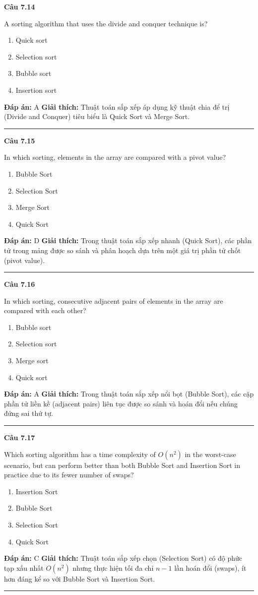\documentclass[11pt,a4paper]{article}
\newenvironment{question}[1]{%
  \par\vspace{1em}\noindent\textbf{\large Câu #1}\par\vspace{0.4em}
}{%
  \par\vspace{1em}\hrule\vspace{0.6em}
}
\newenvironment{choices}{%
  \begin{enumerate}[label=\textbf{\Alph*.},leftmargin=2.2em,itemsep=2pt,topsep=3pt]
}{%
  \end{enumerate}
}
\newcommand{\choice}{\item}
\begin{document}
\begin{question}{7.14}
A sorting algorithm that uses the divide and conquer technique is?
\begin{choices}
\choice Quick sort
\choice Selection sort
\choice Bubble sort
\choice Insertion sort
\end{choices}
\textbf{Đáp án:} A
\textbf{Giải thích:} Thuật toán sắp xếp áp dụng kỹ thuật chia để trị (Divide and Conquer) tiêu biểu là Quick Sort và Merge Sort.
\end{question}

\begin{question}{7.15}
In which sorting, elements in the array are compared with a pivot value?
\begin{choices}
\choice Bubble Sort
\choice Selection Sort
\choice Merge Sort
\choice Quick Sort
\end{choices}
\textbf{Đáp án:} D
\textbf{Giải thích:} Trong thuật toán sắp xếp nhanh (Quick Sort), các phần tử trong mảng được so sánh và phân hoạch dựa trên một giá trị phần tử chốt (pivot value).
\end{question}

\begin{question}{7.16}
In which sorting, consecutive adjacent pairs of elements in the array are compared with each other?
\begin{choices}
\choice Bubble sort
\choice Selection sort
\choice Merge sort
\choice Quick sort
\end{choices}
\textbf{Đáp án:} A
\textbf{Giải thích:} Trong thuật toán sắp xếp nổi bọt (Bubble Sort), các cặp phần tử liền kề (adjacent pairs) liên tục được so sánh và hoán đổi nếu chúng đứng sai thứ tự.
\end{question}

\begin{question}{7.17}
Which sorting algorithm has a time complexity of \(O(n^2)\) in the worst-case scenario, but can perform better than both Bubble Sort and Insertion Sort in practice due to its fewer number of swaps?
\begin{choices}
\choice Insertion Sort
\choice Bubble Sort
\choice Selection Sort
\choice Quick Sort
\end{choices}
\textbf{Đáp án:} C
\textbf{Giải thích:} Thuật toán sắp xếp chọn (Selection Sort) có độ phức tạp xấu nhất \(O(n^2)\) nhưng thực hiện tối đa chỉ \(n - 1\) lần hoán đổi (swaps), ít hơn đáng kể so với Bubble Sort và Insertion Sort.
\end{question}
\end{document}
